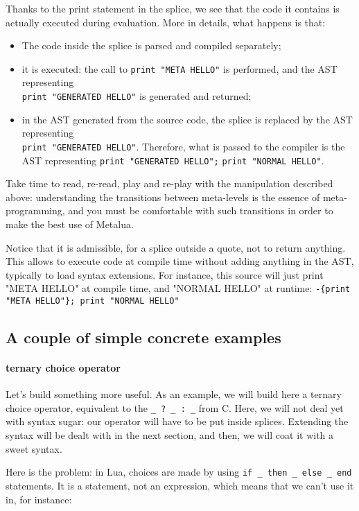 Thanks to the print statement in the splice, we see that the code
it contains is actually executed during evaluation. More in details,
what happens is that:
\begin{itemize}
\item The code inside the splice is parsed and compiled separately;
\item it is executed: the call to \verb|print "META HELLO"| is
  performed, and the AST representing \\ \verb|print "GENERATED HELLO"| is
  generated and returned;
\item in the AST generated from the source code, the splice is
  replaced by the AST representing \\ \verb|print "GENERATED HELLO"|.
  Therefore, what is passed to the compiler is the AST representing 
  \verb|print "GENERATED HELLO";| \verb|print "NORMAL HELLO"|.
\end{itemize}

Take time to read, re-read, play and re-play with the manipulation
described above: understanding the transitions between meta-levels is
the essence of meta-programming, and you must be comfortable with such
transitions in order to make the best use of Metalua.

Notice that it is admissible, for a splice outside a quote, not to
return anything. This allows to execute code at compile time without
adding anything in the AST, typically to load syntax extensions. For
instance, this source will just print "META HELLO" at compile time,
and "NORMAL HELLO" at runtime:
\verb|-{print "META HELLO"}; print "NORMAL HELLO"|

\subsection{A couple of simple concrete examples}

\paragraph{ternary choice operator}
Let's build something more useful. As an example, we will build here a
ternary choice operator, equivalent to the \verb|_ ? _ : _| from
C. Here, we will not deal yet with syntax sugar: our operator will
have to be put inside splices. Extending the syntax will be dealt with
in the next section, and then, we will coat it with a sweet syntax.

Here is the problem: in Lua, choices are made by using
\verb|if _ then _ else _ end| statements. It is a statement, not an
expression, which means that we can't use it in, for instance:

